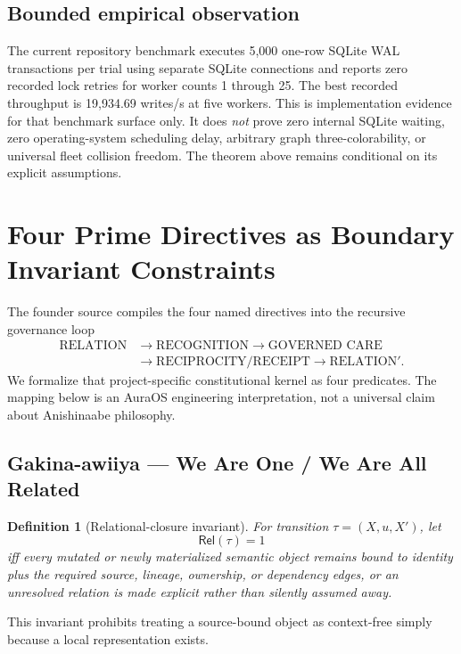\documentclass[11pt]{article}
\newtheorem{definition}{Definition}
\newcommand{\Rel}{\mathsf{Rel}}
\begin{document}
\subsection{Bounded empirical observation}

The current repository benchmark executes 5,000 one-row SQLite WAL transactions per trial using separate SQLite connections and reports zero recorded lock retries for worker counts 1 through 25. The best recorded throughput is 19,934.69 writes/s at five workers. This is implementation evidence for that benchmark surface only. It does \emph{not} prove zero internal SQLite waiting, zero operating-system scheduling delay, arbitrary graph three-colorability, or universal fleet collision freedom. The theorem above remains conditional on its explicit assumptions.

\section{Four Prime Directives as Boundary Invariant Constraints}

The founder source compiles the four named directives into the recursive governance loop
\[
\begin{aligned}
\text{RELATION}&\rightarrow\text{RECOGNITION}\rightarrow\text{GOVERNED CARE}\\
&\rightarrow\text{RECIPROCITY/RECEIPT}\rightarrow\text{RELATION}'.
\end{aligned}
\]
We formalize that project-specific constitutional kernel as four predicates. The mapping below is an AuraOS engineering interpretation, not a universal claim about Anishinaabe philosophy.

\subsection{Gakina-awiiya --- We Are One / We Are All Related}

\begin{definition}[Relational-closure invariant]
For transition \(\tau=(X,u,X')\), let
\[
\Rel(\tau)=1
\]
iff every mutated or newly materialized semantic object remains bound to identity plus the required source, lineage, ownership, or dependency edges, or an unresolved relation is made explicit rather than silently assumed away.
\end{definition}

This invariant prohibits treating a source-bound object as context-free simply because a local representation exists.
\end{document}
